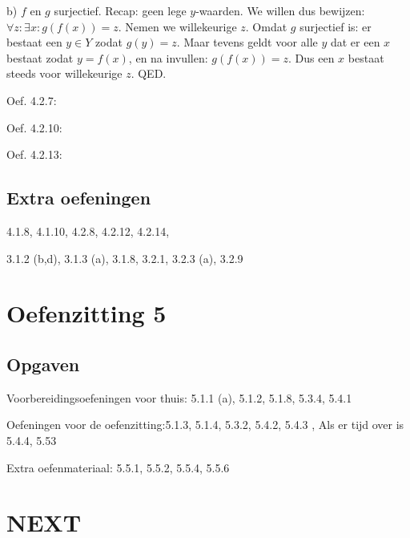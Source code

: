 \documentclass{article}
\begin{document}
b) $f$ en $g$ surjectief. Recap: geen lege $y$-waarden. We willen dus bewijzen: $\forall z: \exists x: g(f(x)) = z$. Nemen we willekeurige $z$. Omdat $g$ surjectief is: er bestaat een $y \in Y$ zodat $g(y)=z$. Maar tevens geldt voor alle $y$ dat er een $x$ bestaat zodat $y=f(x)$, en na invullen: $g(f(x))=z$. Dus een $x$ bestaat steeds voor willekeurige $z$. QED. 



Oef. 4.2.7: 

Oef. 4.2.10: 

Oef. 4.2.13: 


\subsection{Extra oefeningen}

 4.1.8, 4.1.10, 4.2.8, 4.2.12, 4.2.14,

3.1.2 (b,d), 3.1.3 (a), 3.1.8, 3.2.1, 3.2.3 (a), 3.2.9


\section{Oefenzitting 5}

\subsection{Opgaven}

Voorbereidingsoefeningen voor thuis: 5.1.1 (a), 5.1.2, 5.1.8, 5.3.4, 5.4.1 

Oefeningen voor de oefenzitting:5.1.3, 5.1.4, 5.3.2, 5.4.2, 5.4.3 , Als er tijd over is  5.4.4, 5.53 

Extra oefenmateriaal: 5.5.1, 5.5.2, 5.5.4, 5.5.6



\section*{NEXT}
\end{document}
